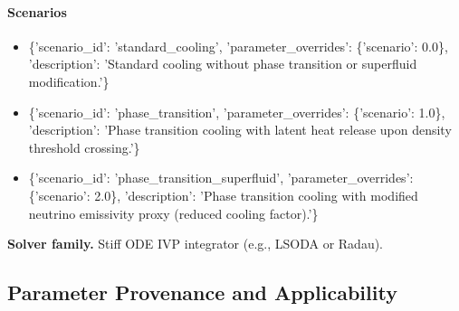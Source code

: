 \documentclass[11pt]{article}
\begin{document}
\paragraph{Scenarios}
\begin{itemize}
\item \{'scenario\_id': 'standard\_cooling', 'parameter\_overrides': \{'scenario': 0.0\}, 'description': 'Standard cooling without phase transition or superfluid modification.'\}
\item \{'scenario\_id': 'phase\_transition', 'parameter\_overrides': \{'scenario': 1.0\}, 'description': 'Phase transition cooling with latent heat release upon density threshold crossing.'\}
\item \{'scenario\_id': 'phase\_transition\_superfluid', 'parameter\_overrides': \{'scenario': 2.0\}, 'description': 'Phase transition cooling with modified neutrino emissivity proxy (reduced cooling factor).'\}
\end{itemize}

\noindent\textbf{Solver family.} Stiff ODE IVP integrator (e.g., LSODA or Radau).

\subsection{Parameter Provenance and Applicability}
\end{document}
